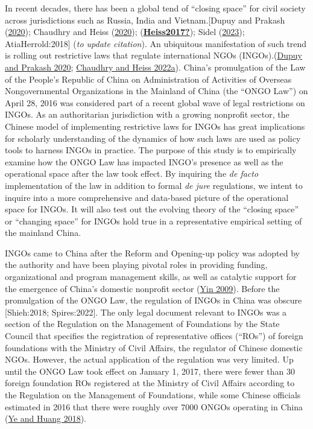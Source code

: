 \documentclass[
]{article}
\begin{document}
In recent decades, there has been a global tend of ``closing space'' for
civil society across jurisdictions such as Russia, India and
Vietnam.{[}Dupuy and Prakash
(\protect\hyperlink{ref-DupuyPrakash:2020}{2020}); Chaudhry and Heiss
(\protect\hyperlink{ref-ChaudhryHeiss:2020}{2020});
(\protect\hyperlink{ref-Heiss2017}{\textbf{Heiss2017?}}); Sidel
(\protect\hyperlink{ref-Sidel:2023}{2023}); AtiaHerrold:2018{]}
(\emph{to update citation}). An ubiquitous manifestation of such trend
is rolling out restrictive laws that regulate international NGOs
(INGOs).(\protect\hyperlink{ref-DupuyPrakash:2020}{Dupuy and Prakash
2020}; \protect\hyperlink{ref-ChaudhryHeiss:2022a}{Chaudhry and Heiss
2022a}). China's promulgation of the Law of the People's Republic of
China on Administration of Activities of Overseas Nongovernmental
Organizations in the Mainland of China (the ``ONGO Law'') on April 28,
2016 was considered part of a recent global wave of legal restrictions
on INGOs. As an authoritarian jurisdiction with a growing nonprofit
sector, the Chinese model of implementing restrictive laws for INGOs has
great implications for scholarly understanding of the dynamics of how
such laws are used as policy tools to harness INGOs in practice. The
purpose of this study is to empirically examine how the ONGO Law has
impacted INGO's presence as well as the operational space after the law
took effect. By inquiring the \emph{de facto} implementation of the law
in addition to formal \emph{de jure} regulations, we intent to inquire
into a more comprehensive and data-based picture of the operational
space for INGOs. It will also test out the evolving theory of the
``closing space'' or ``changing space'' for INGOs hold true in a
representative empirical setting of the mainland China.

INGOs came to China after the Reform and Opening-up policy was adopted
by the authority and have been playing pivotal roles in providing
funding, organizational and program management skills, as well as
catalytic support for the emergence of China's domestic nonprofit sector
(\protect\hyperlink{ref-Yin:2009}{Yin 2009}). Before the promulgation of
the ONGO Law, the regulation of INGOs in China was obscure
{[}Shieh:2018; Spires:2022{]}. The only legal document relevant to INGOs
was a section of the Regulation on the Management of Foundations by the
State Council that specifies the registration of representative offices
(``ROs'') of foreign foundations with the Ministry of Civil Affairs, the
regulator of Chinese domestic NGOs. However, the actual application of
the regulation was very limited. Up until the ONGO Law took effect on
January 1, 2017, there were fewer than 30 foreign foundation ROs
registered at the Ministry of Civil Affairs according to the Regulation
on the Management of Foundations, while some Chinese officials estimated
in 2016 that there were roughly over 7000 ONGOs operating in China
(\protect\hyperlink{ref-YeHuang:2018}{Ye and Huang 2018}).
\end{document}
